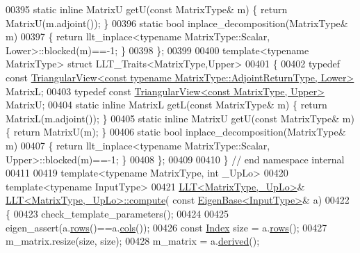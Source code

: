\begin{DoxyCode}
00395   \textcolor{keyword}{static} \textcolor{keyword}{inline} MatrixU getU(\textcolor{keyword}{const} MatrixType& m) \{ \textcolor{keywordflow}{return} MatrixU(m.adjoint()); \}
00396   \textcolor{keyword}{static} \textcolor{keywordtype}{bool} inplace\_decomposition(MatrixType& m)
00397   \{ \textcolor{keywordflow}{return} llt\_inplace<typename MatrixType::Scalar, Lower>::blocked(m)==-1; \}
00398 \};
00399 
00400 \textcolor{keyword}{template}<\textcolor{keyword}{typename} MatrixType> \textcolor{keyword}{struct }LLT\_Traits<MatrixType,Upper>
00401 \{
00402   \textcolor{keyword}{typedef} \textcolor{keyword}{const} 
      \hyperlink{group___core___module_class_eigen_1_1_triangular_view}{TriangularView<const typename MatrixType::AdjointReturnType, Lower>}
       MatrixL;
00403   \textcolor{keyword}{typedef} \textcolor{keyword}{const} \hyperlink{group___core___module_class_eigen_1_1_triangular_view}{TriangularView<const MatrixType, Upper>} MatrixU;
00404   \textcolor{keyword}{static} \textcolor{keyword}{inline} MatrixL getL(\textcolor{keyword}{const} MatrixType& m) \{ \textcolor{keywordflow}{return} MatrixL(m.adjoint()); \}
00405   \textcolor{keyword}{static} \textcolor{keyword}{inline} MatrixU getU(\textcolor{keyword}{const} MatrixType& m) \{ \textcolor{keywordflow}{return} MatrixU(m); \}
00406   \textcolor{keyword}{static} \textcolor{keywordtype}{bool} inplace\_decomposition(MatrixType& m)
00407   \{ \textcolor{keywordflow}{return} llt\_inplace<typename MatrixType::Scalar, Upper>::blocked(m)==-1; \}
00408 \};
00409 
00410 \} \textcolor{comment}{// end namespace internal}
00411 
00419 \textcolor{keyword}{template}<\textcolor{keyword}{typename} MatrixType, \textcolor{keywordtype}{int} \_UpLo>
00420 \textcolor{keyword}{template}<\textcolor{keyword}{typename} InputType>
00421 \hyperlink{group___cholesky___module_class_eigen_1_1_l_l_t}{LLT<MatrixType,\_UpLo>}& \hyperlink{group___cholesky___module_class_eigen_1_1_l_l_t}{LLT<MatrixType,\_UpLo>::compute}(\textcolor{keyword}{
      const} \hyperlink{group___core___module_struct_eigen_1_1_eigen_base}{EigenBase<InputType>}& a)
00422 \{
00423   check\_template\_parameters();
00424 
00425   eigen\_assert(a.\hyperlink{group___core___module_a8141320ba8df384426c298b32b000d8e}{rows}()==a.\hyperlink{group___core___module_a7b0b45c7351847696c911ce8aa2abbdb}{cols}());
00426   \textcolor{keyword}{const} \hyperlink{group___cholesky___module_ac7a64274814fa76e8b1e9e945546037f}{Index} size = a.\hyperlink{group___core___module_a8141320ba8df384426c298b32b000d8e}{rows}();
00427   m\_matrix.resize(size, size);
00428   m\_matrix = a.\hyperlink{group___core___module_a324b16961a11d2ecfd2d1b7dd7946545}{derived}();

\end{DoxyCode}
